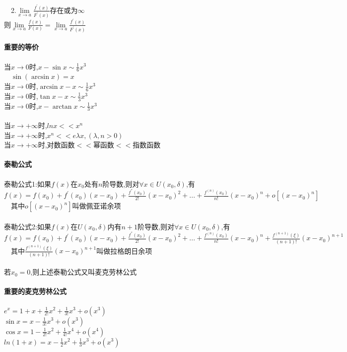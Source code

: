 \documentclass{article}
\begin{document}
\begin{flushleft}
	\ \ 2.$\lim\limits_{x\to a}\frac{f^{'}(x)}{F^{'}(x)}$存在或为$\infty$\\
	则$\lim\limits_{x\to a}\frac{f(x)}{F(x)}=\lim\limits_{x\to a}\frac{f^{'}(x)}{F^{'}(x)}$\\
	~\\ \textbf{重要的等价} \\~\\
	当$x\to 0$时,$x-\sin x \sim \frac{1}{6}x^3$\\
	\ \ $\sin(\arcsin x)=x$\\
	当$x\to 0$时,$\arcsin x-x \sim \frac{1}{6}x^3$\\
	当$x\to 0$时,$\tan x-x \sim \frac{1}{3}x^3$\\
	当$x\to 0$时,$x-\arctan x \sim \frac{1}{3}x^3$\\
	~\\
	当$x\to +\infty$时,$lnx << x^n$\\
	当$x\to +\infty$时,$x^n << e{\lambda x},(\lambda,n>0)$\\
	当$x\to +\infty$时,对数函数$<<$幂函数$<<$指数函数\\
	~\\ \textbf{泰勒公式} \\~\\
	泰勒公式1:如果$f(x)$在$x_0$处有$n$阶导数,则对$\forall x \in U(x_0,\delta)$,有$f(x)=f(x_0)+f^{'}(x_0)(x-x_0)+\frac{f^{''}(x_0)}{2!}(x-x_0)^2+...+\frac{f^{(n)}(x_0)}{n!}(x-x_0)^n+o[(x-x_0)^n]$\\
	\ \ 其中$o[(x-x_0)^n]$叫做佩亚诺余项\\
	~\\
	泰勒公式2:如果$f(x)$在$U(x_0,\delta)$内有$n+1$阶导数,则对$\forall x \in U(x_0,\delta)$,有$f(x)=f(x_0)+f^{'}(x_0)(x-x_0)+\frac{f^{''}(x_0)}{2!}(x-x_0)^2+...+\frac{f^{(n)}(x_0)}{n!}(x-x_0)^n+\frac{f^{(n+1)}(\xi)}{(n+1)!}(x-x_0)^{n+1}$\\
	\ \ 其中$\frac{f^{(n+1)}(\xi)}{(n+1)!}(x-x_0)^{n+1}$叫做拉格朗日余项\\
	~\\
	若$x_0=0$,则上述泰勒公式又叫麦克劳林公式\\
	~\\ \textbf{重要的麦克劳林公式} \\~\\
	$e^x=1+x+\frac{1}{2!}x^2+\frac{1}{3!}x^3+o(x^3)$\\
	$\sin x=x-\frac{1}{3!}x^3+o(x^3)$\\
	$\cos x=1-\frac{1}{2!}x^2+\frac{1}{4!}x^4+o(x^4)$\\
	$ln(1+x)=x-\frac{1}{2}x^2+\frac{1}{3}x^3+o(x^3)$\\

\end{flushleft}
\end{document}
